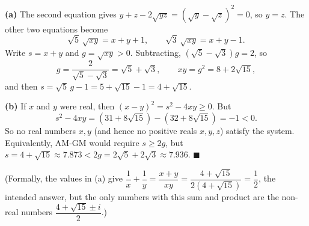 \textbf{(a)} The second equation gives $y+z-2\sqrt{yz}=\left(\sqrt y-\sqrt z\right)^2=0$, so $y=z$. The other two equations become
\[\sqrt5\,\sqrt{xy}=x+y+1,\qquad\sqrt3\,\sqrt{xy}=x+y-1 .\]
Write $s=x+y$ and $g=\sqrt{xy}>0$. Subtracting, $\left(\sqrt5-\sqrt3\right)g=2$, so
\[g=\dfrac{2}{\sqrt5-\sqrt3}=\sqrt5+\sqrt3,\qquad xy=g^2=8+2\sqrt{15},\]
and then $s=\sqrt5\,g-1=5+\sqrt{15}-1=4+\sqrt{15}$.

\textbf{(b)} If $x$ and $y$ were real, then $(x-y)^2=s^2-4xy\ge0$. But
\[s^2-4xy=\left(31+8\sqrt{15}\right)-\left(32+8\sqrt{15}\right)=-1<0 .\]
So no real numbers $x,y$ (and hence no positive reals $x,y,z$) satisfy the system. Equivalently, AM-GM would require $s\ge2g$, but $s=4+\sqrt{15}\approx7.873<2g=2\sqrt5+2\sqrt3\approx7.936$. $\blacksquare$

(Formally, the values in (a) give $\dfrac{1}{x}+\dfrac{1}{y}=\dfrac{x+y}{xy}=\dfrac{4+\sqrt{15}}{2\left(4+\sqrt{15}\right)}=\dfrac{1}{2}$, the intended answer, but the only numbers with this sum and product are the non-real numbers $\dfrac{4+\sqrt{15}\pm i}{2}$.)
